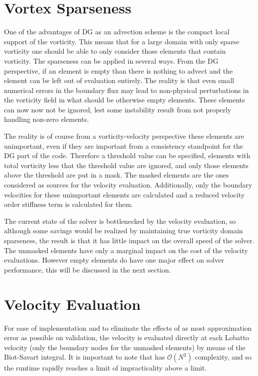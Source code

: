 \documentclass[letterpaper,12pt]{report}
\begin{document}
%
\section{Vortex Sparseness}
One of the advantages of DG as an advection scheme is the compact local support of the vorticity. This means that for a large domain with only sparse vorticity one should be able to only consider those elements that contain vorticity. The sparseness can be applied in several ways. From the DG perspective, if an element is empty than there is nothing to advect and the element can be left out of evaluation entirely. The reality is that even small numerical errors in the boundary flux may lead to non-physical perturbations in the vorticity field in what should be otherwise empty elements. These elements can now now not be ignored, lest some instability result from not properly handling non-zero elements.

The reality is of course from a vorticity-velocity perspective these elements are unimportant, even if they are important from a consistency standpoint for the DG part of the code. Therefore a threshold value can be specified, elements with total vorticity less that the threshold value are ignored, and only those elements above the threshold are put in a mask. The masked elements are the ones considered as sources for the velocity evaluation. Additionally, only the boundary velocities for these unimportant elements are calculated and a reduced velocity order stiffness term is calculated for them.

The current state of the solver is bottlenecked by the velocity evaluation, so although some savings would be realized by maintaining true vorticity domain sparseness, the result is that it has little impact on the overall speed of the solver. The unmasked elements have only a marginal impact on the cost of the velocity evaluations. However empty elements do have one major effect on solver performance, this will be discussed in the next section.

%
\section{Velocity Evaluation}
For ease of implementation and to eliminate the effects of as most approximation error as possible on validation, the velocity is evaluated directly at each Lobatto velocity (only the boundary nodes for the unmasked elements) by means of the Biot-Savart integral. It is important to note that has $\mathcal{O}(N^2)$ complexity, and so the runtime rapidly reaches a limit of impracticality above a limit.
\end{document}
